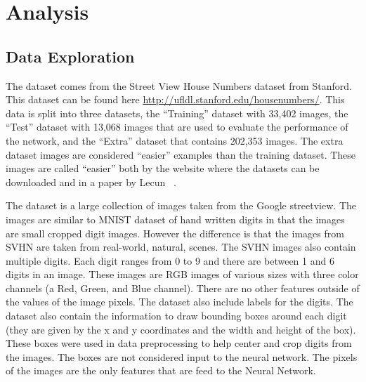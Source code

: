 \documentclass[12pt,twocolumn,letterpaper]{article}
\begin{document}

\section{Analysis}
\subsection{Data Exploration}

The dataset comes from the Street View House Numbers dataset from Stanford. This
dataset can be found here \url{http://ufldl.stanford.edu/housenumbers/}. This 
data is split into three datasets, the ``Training'' dataset with 33,402 images, 
the ``Test'' dataset with 13,068 images that are used to evaluate the performance 
of the network, and the ``Extra'' dataset that contains 202,353 images. The extra 
dataset images are considered ``easier'' examples than the training dataset. 
These images are called ``easier'' both by the website where the datasets can 
be downloaded and in a paper by Lecun \etal ~\cite{sermanet-icpr-12}.

The dataset is a large collection of images taken from the Google streetview. The
images are similar to MNIST dataset of hand written digits in that the images are 
small cropped digit images. However the difference is that the images from SVHN 
are taken from real-world, natural, scenes. The SVHN images also contain multiple 
digits. Each digit ranges from 0 to 9 and there are between 1 and 6 digits in an 
image. These images are RGB images of various sizes with three color channels (a 
Red, Green, and Blue channel). There are no other features outside of the values 
of the image pixels. The dataset also include labels for the digits. The dataset 
also contain the information to draw bounding boxes around each digit (they are 
given by the x and y coordinates and the width and height of the box). These 
boxes were used in data preprocessing to help center and crop digits from the 
images. The boxes are not considered input to the neural network. The pixels of 
the images are the only features that are feed to the Neural Network.
\end{document}

